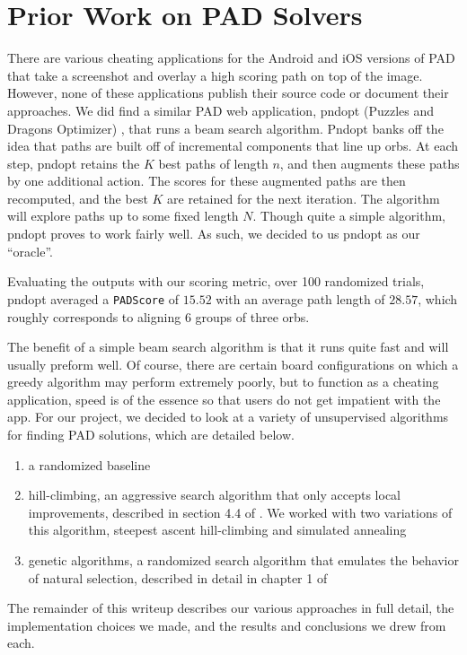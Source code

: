 \documentclass[journal,final,letterpaper,11pt]{IEEEtran}
\begin{document}
\section{Prior Work on PAD Solvers}
There are various cheating applications for the Android and iOS versions of PAD that take a screenshot and overlay a high scoring path on top of the image. However, none of these applications publish their source code or document their approaches. 
We did find a similar PAD web application, pndopt (Puzzles and Dragons Optimizer) \cite{2}, that runs a beam search algorithm. Pndopt banks off the idea that paths are built off of incremental components that line up orbs. At each step, pndopt retains the $K$ best paths of length $n$, and then augments these paths by one additional action. The scores for these augmented paths are then recomputed, and the best $K$ are retained for the next iteration. The algorithm will explore paths up to some fixed length $N$. Though quite a simple algorithm, pndopt proves to work fairly well. As such, we decided to us pndopt as our ``oracle''.

Evaluating the outputs with our scoring metric, over 100 randomized trials, pndopt averaged a \texttt{PADScore} of $15.52$ with an average path length of $28.57$, which roughly corresponds to aligning $6$ groups of three orbs. 

The benefit of a simple beam search algorithm is that it runs quite fast and will usually preform well. Of course, there are certain board configurations on which a greedy algorithm may perform extremely poorly, but to function as a cheating application, speed is of the essence so that users do not get impatient with the app. For our project, we decided to look at a variety of unsupervised algorithms for finding PAD solutions, which are detailed below.

\begin{enumerate}
\item a randomized baseline
\item hill-climbing, an aggressive search algorithm that only accepts local improvements, described in section 4.4 of \cite{3}. We worked with two variations of this algorithm, steepest ascent hill-climbing and simulated annealing
\item genetic algorithms, a randomized search algorithm that emulates the behavior of natural selection, described in detail in chapter 1 of \cite{4}
\end{enumerate}

The remainder of this writeup describes our various approaches in full detail, the implementation choices we made, and the results and conclusions we drew from each. 
\end{document}
